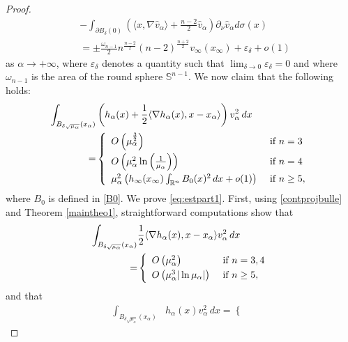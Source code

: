 \documentclass[10pt]{amsart}
\numberwithin{equation}{section}
\newcommand{\ve}{\varepsilon}
\newcommand{\ma}{\mu_\alpha}
\def \rr {\mathbb{R}}
\def \xl{x_\alpha}
\def \ma{\mu_{\alpha}}
\def \hva{\hat{v}_{\alpha}}
\def \va{v_{\alpha}}
\def \ha{h_{\alpha}}
\def \hi{h_{\infty}}
\def \vo {v_{\infty}}
\def \xin{x_{\infty}}
\def \r {\rangle}
\def \l{\langle}
\def \bsa{B_{\delta\sqrt{\ma}}}
\theoremstyle{plain}
\theoremstyle{remark}
\begin{document}
\begin{proof}
\begin{equation}
\begin{aligned}
		& -\int_{\partial B_{\delta}(0)}\left( \l x, \nabla \hva \r+\frac{n-2}{2}\hva \right)\partial_{\nu}\hva  d\sigma(x) \\
		& = \pm \frac{\omega_{n-1}}{2}n^{\frac{n-2}{2}}(n-2)^{\frac{n+2}{2}}\vo(\xin) + \ve_\delta + o(1)
		\end{aligned}
	\end{equation}
as $\alpha \to + \infty$, where $\ve_\delta$ denotes a quantity such that $\lim_{\delta \to 0} \ve_\delta = 0$ and where $\omega_{n-1}$ is the area of the round sphere $\mathbb{S}^{n-1}$. We now claim that the following holds:
	\begin{equation}\label{eq:estpart1}
	\begin{aligned}
		 \int_{\bsa(\xl)}& \left( \ha(x)+\frac12 \l\nabla \ha(x),x-\xl \r \right)\va^2\, dx \\=	
		& \left\{\begin{array}{ll}
		\vspace{0.1cm}	O\left( \ma^{\frac{3}{2}}\right)  &\hbox{ if } n=3\\
		\vspace{0.1cm}	O\left( \ma^2\ln\left(\frac{1}{\ma}\right)\right)	 &\hbox{ if } n=4\\
			\ma^2\left( \hi(\xin)\int_{\rr^n} B_0(x)^2\, dx+o(1)\right)  &\hbox{ if } n\geq 5,
		\end{array}\right.
		\end{aligned} 
	\end{equation}
	where $B_0$ is defined in \eqref{B0}. We prove  \eqref{eq:estpart1}. First, using \eqref{contprojbulle} and Theorem \ref{maintheo1}, straightforward computations show that 
\begin{equation}\label{eq:estpart1:1}
\begin{aligned}
 \int_{\bsa(\xl)}&\frac12 \l\nabla \ha(x),x-\xl \r \va^2\, dx\\
  =&\left\{\begin{array}{ll}
		\vspace{0.1cm}	O\left( \ma^{2}\right)  &\hbox{ if } n=3,4\\
			O \left( \ma^3 |\ln \ma| \right)  &\hbox{ if } n\geq 5,
		\end{array}\right.
\end{aligned} 
\end{equation} 
and that 
	\begin{equation}\label{eq:estpart1:2}
	\begin{aligned}
	 \int_{\bsa(\xl)}&  \ha(x)\va^2\, dx = \left\{\begin{array}{ll}

\end{array}
\end{aligned}
\end{equation}
\end{proof}
\end{document}
